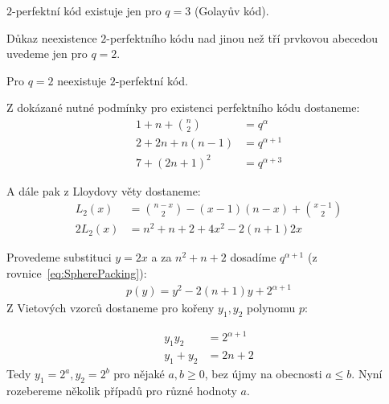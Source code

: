 \vt $2$-perfektní kód existuje jen pro $q = 3$ (Golayův kód).

Důkaz neexistence $2$-perfektního kódu nad jinou než tří prvkovou abecedou uvedeme jen pro $q = 2$.

\vt Pro $q=2$ neexistuje $2$-perfektní kód.

\dk Z dokázané nutné podmínky pro existenci perfektního kódu dostaneme:
\begin{align}
	1 + n + {n \choose 2} &= q^\alpha  \\
	2 + 2n + n(n-1) &= q^{\alpha + 1} \label{eq:SpherePacking}\\
	7 + (2n + 1)^2 &=q^{\alpha + 3} \label{eq:SpherePacking2}
\end{align}

A dále pak z Lloydovy věty dostaneme:
\begin{align*}
L_2(x) &= {n - x \choose 2} - (x - 1)(n -x) + {x - 1 \choose 2} \\
2L_2(x) &= n^2 + n + 2 + 4x^2 - 2(n + 1)2x
\end{align*}

Provedeme substituci $y = 2x$ a za $n^2 + n + 2$ dosadíme $q^{\alpha + 1}$ (z rovnice~\ref{eq:SpherePacking}):
\begin{align*}
p(y) = y^2 - 2(n+1)y + 2^{\alpha + 1}
\end{align*}
Z Vietových vzorců dostaneme pro kořeny $y_1, y_2$ polynomu $p$:

\begin{align}
y_1y_2 &= 2^{\alpha + 1} \\
y_1 + y_2 &= 2n + 2 \label{eq:Viet}
\end{align}
Tedy $y_1 = 2^a, y_2 = 2^b$ pro nějaké $a,b \geq 0$, bez újmy na obecnosti $a \leq b$. Nyní rozebereme několik případů pro různé hodnoty $a$.

